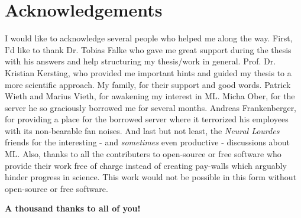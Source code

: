 \documentclass[report,type=bsc,colorback,accentcolor=tud9c,bigchapter,bibliography=totoc,11pt]{tudthesis}
\author{David Marlon Gengenbach}
\begin{document}
  \makethesistitle
  \tableofcontents
  \newpage
  \setcounter{page}{1}
  \abstract{}
  \newpage
  
  \newpage

  \printbibliography[heading=bibintoc]

  
  \listoffigures
  
  \listoftables
  
  \newpage
  \section*{Acknowledgements}
  I would like to acknowledge several people who helped me along the way.
  First, I'd like to thank Dr. Tobias Falke who gave me great support during the thesis with his answers and help structuring my thesis/work in general.
  Prof. Dr. Kristian Kersting, who provided me important hints and guided my thesis to a more scientific approach.
  My family, for their support and good words.
  Patrick Wieth and Marius Vieth, for awakening my interest in ML.
  Micha Ober, for the server he so graciously borrowed me for several months.
  Andreas Frankenberger, for providing a place for the borrowed server where it terrorized his employees with its non-bearable fan noises.
  And last but not least, the \textit{Neural Lourdes} friends for the interesting - and \textit{sometimes} even productive - discussions about ML.
  Also, thanks to all the contributers to open-source or free software who provide their work free of charge instead of creating pay-walls which arguably hinder progress in science.
  This work would not be possible in this form without open-source or free software.
  
  \vspace{0.5cm}
  \centering\textsf{\textbf{A thousand thanks to all of you!}}
\end{document}
